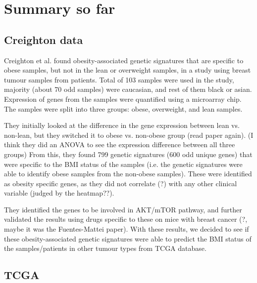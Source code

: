 \documentclass[a4paper, 11pt]{article}
\begin{document}
\section*{Summary so far}

\subsection*{Creighton data}

Creighton et al. found obesity-associated genetic signatures that are specific to obese samples, but not in the lean or overweight samples, in a study using breast tumour samples from patients.
Total of 103 samples were used in the study, majority (about 70 odd samples) were caucasian, and rest of them black or asian.
Expression of genes from the samples were quantified using a microarray chip.
The samples were split into three groups: obese, overweight, and lean samples.

They initially looked at the difference in the gene expression between lean vs. non-lean, but they switched it to obese vs. non-obese group (read paper again).
(I think they did an ANOVA to see the expression difference between all three groups)
From this, they found 799 genetic signatures (600 odd unique genes) that were specific to the BMI status of the samples (i.e. the genetic signatures were able to identify obese  samples from the non-obese samples).
These were identified as obesity specific genes, as they did not correlate (?) with any other clinical variable (judged by the heatmap??).

They identified the genes to be involved in AKT/mTOR pathway, and further validated the results using drugs specific to these on mice with breast cancer (?, maybe it was the Fuentes-Mattei paper).
With these results, we decided to see if these obesity-associated genetic signatures were able to predict the BMI status of the samples/patients in other tumour types from TCGA database.

\subsection{TCGA}
\end{document}
